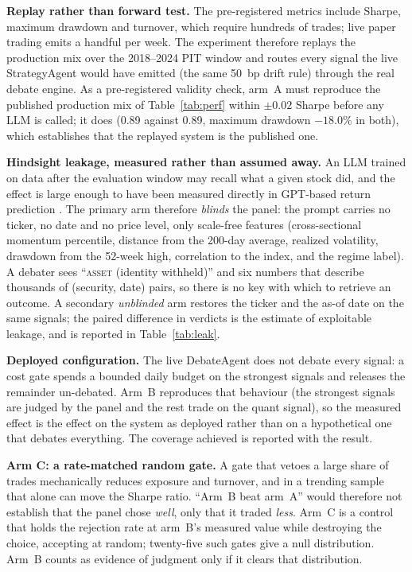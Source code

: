 \documentclass[10pt,twocolumn]{IEEEtran}
\begin{document}
\textbf{Replay rather than forward test.} The pre-registered metrics include
Sharpe, maximum drawdown and turnover, which require hundreds of trades; live
paper trading emits a handful per week. The experiment therefore replays the
production mix over the 2018--2024 PIT window and routes every signal the live
StrategyAgent would have emitted (the same 50~bp drift rule) through the real
debate engine.
As a pre-registered validity check, arm~A must reproduce the published
production mix of Table~\ref{tab:perf} within $\pm 0.02$ Sharpe before any LLM
is called; it does (0.89 against 0.89, maximum drawdown $-18.0\%$ in both),
which
establishes that the replayed system is the published one.

\textbf{Hindsight leakage, measured rather than assumed away.} An LLM trained
on data after the evaluation window may recall what a given stock did, and the
effect is large enough to have been measured directly in GPT-based return
prediction \cite{glasserman2023lookahead}. The
primary arm therefore \emph{blinds} the panel: the prompt carries no ticker, no
date and no price level, only scale-free features (cross-sectional momentum
percentile, distance from the 200-day average, realized volatility, drawdown
from the 52-week high, correlation to the index, and the regime label). A
debater sees ``\textsc{asset} (identity withheld)'' and six numbers that
describe thousands of (security, date) pairs, so there is no key with which to
retrieve an outcome. A secondary \emph{unblinded} arm restores the ticker and
the as-of date on the same signals; the paired difference in verdicts is the
estimate of exploitable leakage, and is reported in
Table~\ref{tab:leak}.

\textbf{Deployed configuration.} The live DebateAgent does not debate every
signal: a cost gate spends a bounded daily budget on the strongest signals and
releases the remainder un-debated. Arm~B reproduces that behaviour (the
strongest signals are judged by the panel and the rest trade on the quant
signal), so the measured effect is the effect on the system as deployed
rather than on a hypothetical one that debates everything. The coverage
achieved is reported with the result.

\textbf{Arm C: a rate-matched random gate.} A gate that vetoes a large share of
trades mechanically reduces exposure and turnover, and in a trending sample
that alone can move the Sharpe ratio. ``Arm~B beat arm~A'' would therefore not
establish that the panel chose \emph{well}, only that it traded \emph{less}.
Arm~C is a control that holds the rejection rate at arm~B's measured value
while destroying the choice, accepting at random; twenty-five such gates give a
null distribution. Arm~B counts as evidence of judgment only if it clears that
distribution.
\end{document}
